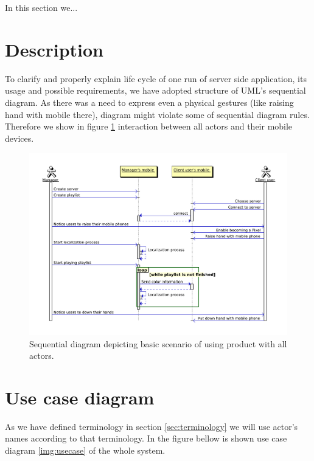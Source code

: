 In this section we...

\section{Description}
To clarify and properly explain life cycle of one run of server side application, its usage and possible requirements, we have adopted structure of UML's sequential diagram. 
As there was a need to express even a physical gestures (like raising hand with mobile there), diagram might violate some of sequential diagram rules.
Therefore we show in figure \ref{img:wholeapp_seq} interaction between all actors and their mobile devices.

\begin{figure}[!h]
    \begin{center}
    \includegraphics[scale=0.4]{images/wholeapp_seq.pdf}
    \caption{Sequential diagram depicting basic scenario of using product with all actors.}
    \label{img:wholeapp_seq}
    \end{center}
\end{figure}


\section{Use case diagram}
As we have defined terminology in section \ref{sec:terminology} we will use actor's names according to that terminology.
In the figure bellow is shown use case diagram \ref{img:usecase} of the whole system.

